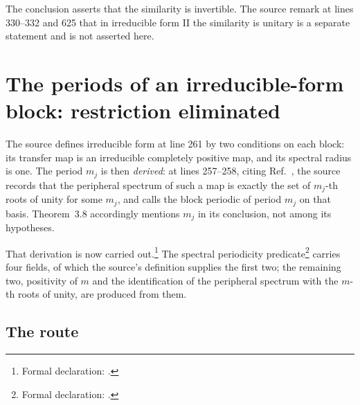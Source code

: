 \documentclass{article}
\begin{document}
The conclusion asserts that the similarity is invertible. The source remark at
lines 330--332 and 625 that in irreducible form II the similarity is unitary is
a separate statement and is not asserted here.

\section{The periods of an irreducible-form block: restriction eliminated}

The source defines irreducible form at line 261 by two conditions on each
block: its transfer map is an irreducible completely positive map, and its
spectral radius is one. The period $m_j$ is then \emph{derived}: at lines
257--258, citing Ref.~\cite{Wolf2012Quantum}, the source records that the
peripheral spectrum of such a map is exactly the set of $m_j$-th roots of unity
for some $m_j$, and calls the block periodic of period $m_j$ on that basis.
Theorem~3.8 accordingly mentions $m_j$ in its conclusion, not among its
hypotheses.

That derivation is now carried out.\footnote{Formal declaration:
.}
The spectral periodicity predicate\footnote{Formal declaration:
.} carries four fields, of which the
source's definition supplies the first two; the remaining two, positivity of
$m$ and the identification of the peripheral spectrum with the $m$-th roots of
unity, are produced from them.

\subsection{The route}
\end{document}
